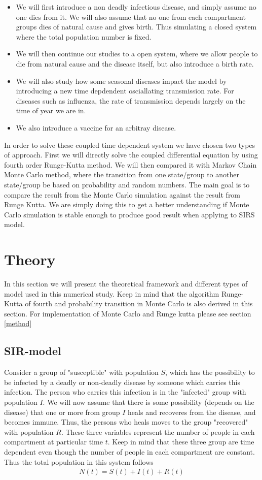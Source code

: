 \documentclass[a4paper, 10pt]{article}
\begin{document}
\begin{itemize}
  \item We will first introduce a
  non deadly infectious disease, and simply assume no one dies from it. We will also
  assume that no one from each compartment groups dies of natural cause and gives birth.
  Thus simulating a closed system where the total population number is fixed.
  \item We will then continue our studies to a open system, where we allow people
  to die from natural cause and the disease itself, but also introduce a birth rate.
  \item We will also study how some seasonal diseases impact the model by
  introducing a new time depdendent osciallating transmission rate. For diseases
  such as influenza, the rate of transmission depends largely on the time of year we are in.
  \item We also introduce a vaccine for an arbitray disease.
\end{itemize}
In order to solve these coupled time dependent system we have chosen two types of approach.
First we will  directly solve the coupled differential equation by using fourth order
Runge-Kutta method. We will then compared it with Markov Chain
Monte Carlo method, where the transition from one state/group to another state/group
be based on probability and random numbers. The main goal is to compare the result from the Monte Carlo simulation against the result from
Runge Kutta. We are simply doing this to get a better understanding if Monte Carlo simulation is stable enough to produce good result when applying
to SIRS model.

\section{Theory}
In this section we will present the theoretical framework and different types of model used in this
numerical study. Keep in mind that the algorithm Runge-Kutta of fourth and probability transition in Monte Carlo
is also derived in this section. For implementation of Monte Carlo and Runge kutta please see section \eqref{method}

\subsection{SIR-model}\label{SIR model}
Consider a group of "susceptible" with population $S$, which has the possibility to be infected by a deadly or non-deadly
disease by someone which carries this infection. The person who carries this infection is in the "infected" group with population $I$.
We will now assume that there is some possibility (depends on the disease) that one or more from group $I$
heals and recoveres from the disease, and becomes immune. Thus, the persons who heals moves to the group "recovered" with population $R$.
These three variables represent the number of people in each compartment at particular time $t$. Keep in mind
that these three group are time dependent even though the number of people in each
compartment are constant. Thus the total population in this system follows
\begin{align}
  N(t) = S(t) + I(t) + R(t)
\end{align}
\end{document}
